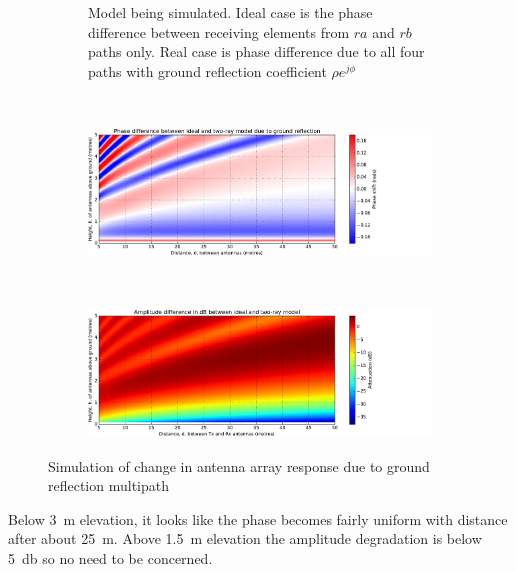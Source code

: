 \begin{figure}
  \centering
  \begin{subfigure}{\textwidth}
    \centering
    
    \caption{Model being simulated. Ideal case is the phase difference between receiving elements from \(ra\) and \(rb\) paths only. Real case is phase difference due to all four paths with ground reflection coefficient \(\rho e^{j\phi}\)}
  \end{subfigure}\\[2em]
  \begin{subfigure}{\textwidth}
    \centering
    \includegraphics[width=\textwidth, clip=true, trim=0 0 140 0]{multipath-phase-shift}
  \end{subfigure}\\[2em]
  \begin{subfigure}{\textwidth}
    \centering
    \includegraphics[width=\textwidth, clip=true, trim=0 0 140 0]{multipath-amplitude-shift}
  \end{subfigure}
  \caption{Simulation of change in antenna array response due to ground reflection multipath}
\end{figure}

Below \SI{3}{\meter} elevation, it looks like the phase becomes fairly uniform with distance after about \SI{25}{\meter}. Above \SI{1.5}{\meter} elevation the amplitude degradation is below \SI{5}{\decibel} so no need to be concerned.

